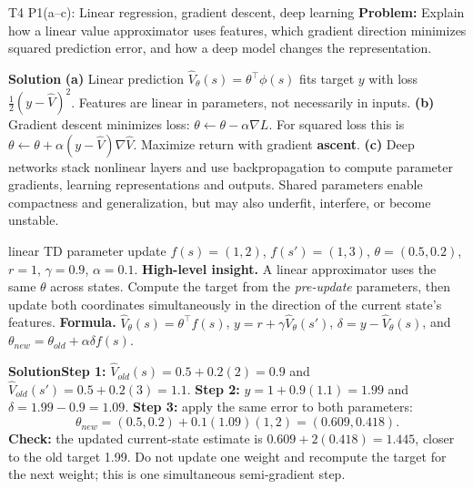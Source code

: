 \documentclass[10pt,a4paper]{article}
\newcommand{\ans}{\par\smallskip\textbf{\color{good}Solution\quad}}
\begin{document}
\begin{question}{T4 P1(a--c): Linear regression, gradient descent, deep learning}\label{q:t4p1}
\textbf{Problem:} Explain how a linear value approximator uses features, which gradient direction minimizes squared prediction error, and how a deep model changes the representation.\ans
\textbf{(a)} Linear prediction $\hat V_\theta(s)=\theta^\top\phi(s)$ fits target $y$ with loss $\frac12(y-\hat V)^2$. Features are linear in parameters, not necessarily in inputs.
\textbf{(b)} Gradient descent minimizes loss: $\theta\leftarrow\theta-\alpha\nabla L$. For squared loss this is $\theta\leftarrow\theta+\alpha(y-\hat V)\nabla\hat V$. Maximize return with gradient \textbf{ascent}.
\textbf{(c)} Deep networks stack nonlinear layers and use backpropagation to compute parameter gradients, learning representations and outputs. Shared parameters enable compactness and generalization, but may also underfit, interfere, or become unstable.
\end{question}

\begin{question}{linear TD parameter update}
$f(s)=(1,2)$, $f(s')=(1,3)$, $\theta=(0.5,0.2)$, $r=1$, $\gamma=0.9$, $\alpha=0.1$.
\textbf{High-level insight.} A linear approximator uses the same $\theta$ across states. Compute the target from the \emph{pre-update} parameters, then update both coordinates simultaneously in the direction of the current state's features.
\textbf{Formula.} $\hat V_\theta(s)=\theta^\top f(s)$, $y=r+\gamma\hat V_\theta(s')$, $\delta=y-\hat V_\theta(s)$, and $\theta_{new}=\theta_{old}+\alpha\delta f(s)$.
\ans \textbf{Step 1:} $\hat V_{old}(s)=0.5+0.2(2)=0.9$ and $\hat V_{old}(s')=0.5+0.2(3)=1.1$.
\textbf{Step 2:} $y=1+0.9(1.1)=1.99$ and $\delta=1.99-0.9=1.09$.
\textbf{Step 3:} apply the same error to both parameters:
\[
\theta_{new}=(0.5,0.2)+0.1(1.09)(1,2)=(0.609,0.418).
\]
\textbf{Check:} the updated current-state estimate is $0.609+2(0.418)=1.445$, closer to the old target 1.99. Do not update one weight and recompute the target for the next weight; this is one simultaneous semi-gradient step.
\end{question}
\end{document}
